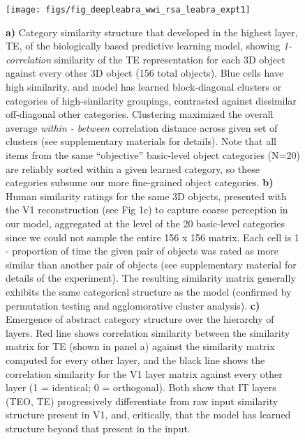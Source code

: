 \documentclass[12pt,twoside]{article}
\newif\myifpdf
\begin{document}
\begin{figure}
  \centering\texttt{[image: figs/fig\_deepleabra\_wwi\_rsa\_leabra\_expt1]}
  \caption{\small {\bf a)} Category similarity structure that developed in the highest layer, TE, of the biologically based predictive learning model, showing {\em 1-correlation} similarity of the TE representation for each 3D object against every other 3D object (156 total objects). Blue cells have high similarity, and model has learned block-diagonal clusters or categories of high-similarity groupings, contrasted against dissimilar off-diagonal other categories.  Clustering maximized the overall average {\em within - between} correlation distance across given set of clusters (see supplementary materials for details).  Note that all items from the same ``objective'' basic-level object categories (N=20) are reliably sorted within a given learned category, so these categories subsume our more fine-grained object categories. {\bf b)} Human similarity ratings for the same 3D objects, presented with the V1 reconstruction (see Fig 1c) to capture coarse perception in our model, aggregated at the level of the 20 basic-level categories since we could not sample the entire 156 x 156 matrix. Each cell is 1 - proportion of time the given pair of objects was rated as more similar than another pair of objects (see supplementary material for details of the experiment).  The resulting similarity matrix generally exhibits the same categorical structure as the model (confirmed by permutation testing and agglomorative cluster analysis).  {\bf c)} Emergence of abstract category structure over the hierarchy of layers.  Red line shows correlation similarity between the similarity matrix for TE (shown in panel a) against the similarity matrix computed for every other layer, and the black line shows the correlation similarity for the V1 layer matrix against every other layer (1 = identical; 0 = orthogonal). Both show that IT layers (TEO, TE) progressively differentiate from raw input similarity structure present in V1, and, critically, that the model has learned structure beyond that present in the input.}
  \label{fig.rsa}
\end{figure}
\end{document}
